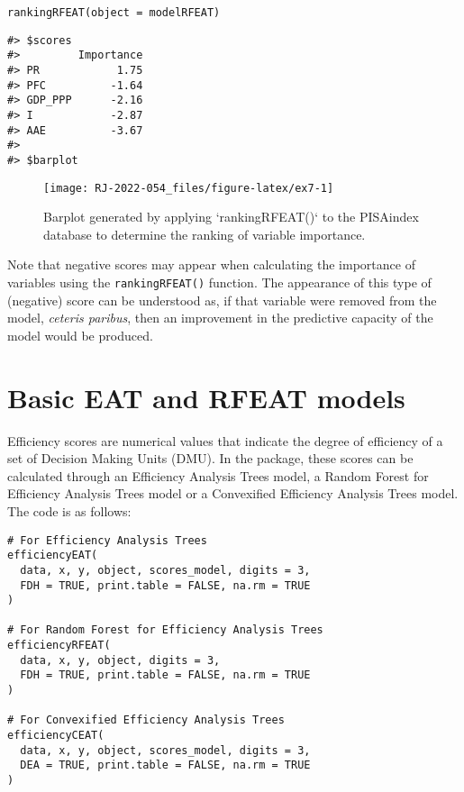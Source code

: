 \begin{verbatim}
rankingRFEAT(object = modelRFEAT)
\end{verbatim}

\begin{verbatim}
#> $scores
#>         Importance
#> PR            1.75
#> PFC          -1.64
#> GDP_PPP      -2.16
#> I            -2.87
#> AAE          -3.67
#> 
#> $barplot
\end{verbatim}

\begin{figure}

{\centering \texttt{[image: RJ-2022-054\_files/figure-latex/ex7-1]} 

}

\caption{Barplot generated by applying `rankingRFEAT()` to the PISAindex database to determine the ranking of variable importance.}\label{fig:ex7}
\end{figure}

Note that negative scores may appear when calculating the importance of variables using the \texttt{rankingRFEAT()} function. The appearance of this type of (negative) score can be understood as, if that variable were removed from the model, \emph{ceteris paribus}, then an improvement in the predictive capacity of the model would be produced.

\hypertarget{section5}{%
\section{Basic EAT and RFEAT models}\label{section5}}

Efficiency scores are numerical values that indicate the degree of efficiency of a set of Decision Making Units (DMU). In the  package, these scores can be calculated through an Efficiency Analysis Trees model, a Random Forest for Efficiency Analysis Trees model or a Convexified Efficiency Analysis Trees model. The code is as follows:

\begin{verbatim}
# For Efficiency Analysis Trees
efficiencyEAT(
  data, x, y, object, scores_model, digits = 3,
  FDH = TRUE, print.table = FALSE, na.rm = TRUE
)

# For Random Forest for Efficiency Analysis Trees
efficiencyRFEAT(
  data, x, y, object, digits = 3, 
  FDH = TRUE, print.table = FALSE, na.rm = TRUE
)

# For Convexified Efficiency Analysis Trees
efficiencyCEAT(
  data, x, y, object, scores_model, digits = 3,
  DEA = TRUE, print.table = FALSE, na.rm = TRUE
)
\end{verbatim}

